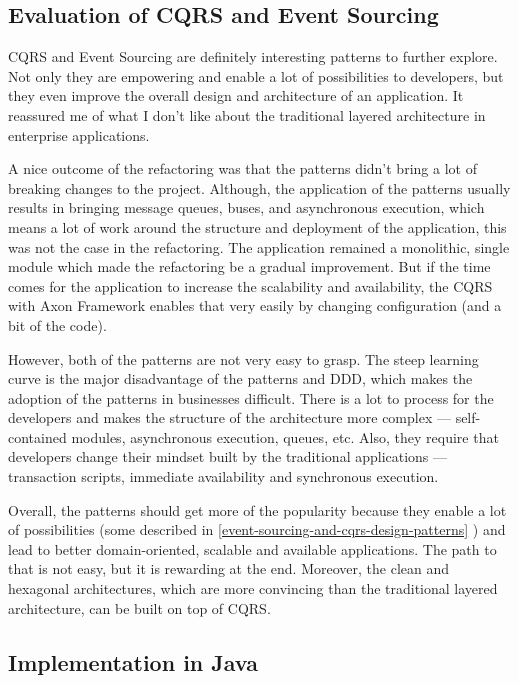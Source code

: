 \documentclass{book}
\begin{document}
\subsection{Evaluation of CQRS and Event
Sourcing}\label{evaluation-of-cqrs-and-event-sourcing}

CQRS and Event Sourcing are definitely interesting patterns to further
explore. Not only they are empowering and enable a lot of possibilities
to developers, but they even improve the overall design and architecture
of an application. It reassured me of what I don't like about the
traditional layered architecture in enterprise applications.

A nice outcome of the refactoring was that the patterns didn't bring a
lot of breaking changes to the project. Although, the application of the
patterns usually results in bringing message queues, buses, and
asynchronous execution, which means a lot of work around the structure
and deployment of the application, this was not the case in the
refactoring. The application remained a monolithic, single module which
made the refactoring be a gradual improvement. But if the time comes for
the application to increase the scalability and availability, the CQRS
with Axon Framework enables that very easily by changing configuration
(and a bit of the code).

However, both of the patterns are not very easy to grasp. The steep
learning curve is the major disadvantage of the patterns and DDD, which
makes the adoption of the patterns in businesses difficult. There is a
lot to process for the developers and makes the structure of the
architecture more complex --- self-contained modules, asynchronous
execution, queues, etc. Also, they require that developers change their
mindset built by the traditional applications --- transaction scripts,
immediate availability and synchronous execution.

Overall, the patterns should get more of the popularity because they
enable a lot of possibilities (some described in
\ref{event-sourcing-and-cqrs-design-patterns}
) and lead to better
domain-oriented, scalable and available applications. The path to that
is not easy, but it is rewarding at the end. Moreover, the clean and
hexagonal architectures, which are more convincing than the traditional
layered architecture, can be built on top of CQRS.

\subsection{Implementation in Java}\label{implementation-in-java}
\end{document}
